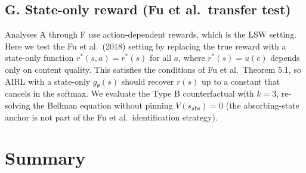 \documentclass[11pt]{article}
\begin{document}
\subsection{G. State-only reward (Fu et al.\ transfer test)}

Analyses A through F use action-dependent rewards, which is the LSW setting. Here we test the Fu et al.\ (2018) setting by replacing the true reward with a state-only function $r^*(s,a) = r^*(s)$ for all $a$, where $r^*(s) = u(c)$ depends only on content quality. This satisfies the conditions of Fu et al.\ Theorem 5.1, so AIRL with a state-only $g_\theta(s)$ should recover $r(s)$ up to a constant that cancels in the softmax. We evaluate the Type B counterfactual with $k = 3$, re-solving the Bellman equation without pinning $V(s_{\mathrm{abs}}) = 0$ (the absorbing-state anchor is not part of the Fu et al.\ identification strategy).

\begin{table}[H]
\centering
{}
\caption{State-only reward DGP. AIRL with state-only $g_\theta(s)$ recovers $r^*(s)$ up to a constant, so the MSE remains positive while the correlation is 1. It transfers perfectly and yields zero Type B counterfactual error. This is the mechanism behind the Fu et al.\ sim-to-real experiments. Generic AIRL without the state-only restriction still fails, with error 0.026, because the shaping residual is action-dependent. The reduced-form advantage has zero correlation with $r^*(s)$ because the true reward is identical across actions and the advantage reflects only continuation-value differences.}
\label{tab:stateonly}
\end{table}

\section{Summary}
\end{document}
